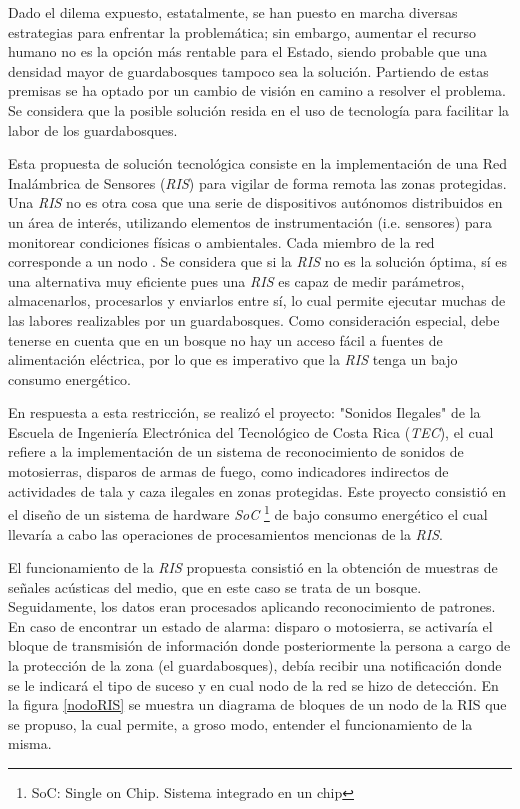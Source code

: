 Dado el dilema expuesto, estatalmente, se han puesto en marcha diversas estrategias para enfrentar la problemática; sin embargo, aumentar el recurso humano no es la opción más rentable para el Estado, siendo probable que una densidad mayor de guardabosques tampoco sea la solución. Partiendo de estas premisas se ha optado por un cambio de visión en camino a resolver el problema. Se considera que la posible solución resida en el uso de tecnología para facilitar la labor de los guardabosques.

Esta propuesta de solución tecnológica consiste en la implementación de una Red Inalámbrica de Sensores (\textit{RIS}) para vigilar de forma remota las zonas protegidas. Una \textit{RIS} no es otra cosa que una serie de dispositivos autónomos distribuidos en un área de interés, utilizando elementos de instrumentación (i.e. sensores) para monitorear condiciones físicas o ambientales. Cada miembro de la red corresponde a un nodo \cite{website:ni}. Se considera que si la \textit{RIS} no es la solución óptima, sí es una alternativa muy eficiente pues una \textit{RIS} es capaz de medir parámetros, almacenarlos, procesarlos y enviarlos entre sí, lo cual permite ejecutar muchas de las labores realizables por un guardabosques. Como consideración especial, debe tenerse en cuenta que en un bosque no hay un acceso fácil a fuentes de alimentación eléctrica, por lo que es imperativo que la \textit{RIS} tenga un bajo consumo energético.

En respuesta a esta restricción, se realizó el proyecto: "Sonidos Ilegales" \cite{website:dcilab} de la Escuela de Ingeniería Electrónica del Tecnológico de Costa Rica (\textit{TEC}), el cual refiere a la implementación de un sistema de reconocimiento de sonidos de motosierras, disparos de armas de fuego, como indicadores indirectos de actividades de tala y caza ilegales en zonas protegidas. Este proyecto consistió en el diseño de un sistema de hardware \textit{SoC} \footnote{SoC: Single on Chip. Sistema integrado en un chip} de bajo consumo energético el cual llevaría a cabo las operaciones de procesamientos mencionas de la \textit{RIS}. \cite{website:inv_esc_electro, sirpa_SoC} 

El funcionamiento de la \textit{RIS} propuesta consistió en la obtención de muestras de señales acústicas del medio, que en este caso se trata de un bosque. Seguidamente, los datos eran procesados aplicando reconocimiento de patrones. En caso de encontrar un estado de alarma: disparo o motosierra, se activaría el bloque de transmisión de información donde posteriormente la persona a cargo de la protección de la zona (el guardabosques), debía recibir una notificación donde se le indicará el tipo de suceso y en cual nodo de la red se hizo de detección. En la figura \ref{nodoRIS} se muestra un diagrama de bloques de un nodo de la RIS que se propuso, la cual permite, a groso modo, entender el funcionamiento de la misma. \nocite{Carlosthesis, Jordanthesis}

